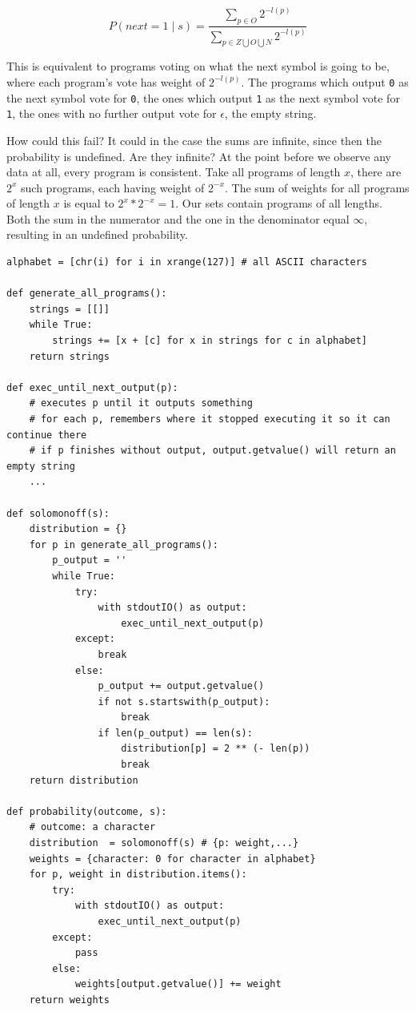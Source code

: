 $$\displaystyle P(next=1 \mid s) = \frac{\sum\limits_{p \in O} 2^{-l(p)}}{\sum\limits_{p \in Z \bigcup O \bigcup N} 2^{-l(p)}}$$

This is equivalent to programs voting on what the next symbol is going to be, where each program's vote has weight of $2^{-l(p)}$.
The programs which output \texttt{0} as the next symbol vote for \texttt{0}, the ones which output \texttt{1} as the next symbol vote for \texttt{1}, the ones with no further output vote for $\epsilon$, the empty string.

How could this fail?
It could in the case the sums are infinite, since then the probability is undefined.
Are they infinite?
At the point before we observe any data at all, every program is consistent.
Take all programs of length $x$, there are $2^x$ such programs, each having weight of $2^{-x}$.
The sum of weights for all programs of length $x$ is equal to $2^x * 2^{-x} = 1$.
Our sets contain programs of all lengths.
Both the sum in the numerator and the one in the denominator equal $\infty$, resulting in an undefined probability.

\newpage

\begin{lstlisting}[caption={A naive algorithmic induction implementation, which runs into a problem with infinite sums.}]
alphabet = [chr(i) for i in xrange(127)] # all ASCII characters

def generate_all_programs():
	strings = [[]]
	while True:
		strings += [x + [c] for x in strings for c in alphabet]
	return strings

def exec_until_next_output(p):
	# executes p until it outputs something
	# for each p, remembers where it stopped executing it so it can continue there
	# if p finishes without output, output.getvalue() will return an empty string
	...

def solomonoff(s):
	distribution = {}
	for p in generate_all_programs():
		p_output = ''
		while True:
			try:
				with stdoutIO() as output:
					exec_until_next_output(p)
			except:
				break
			else:
				p_output += output.getvalue()
				if not s.startswith(p_output):
					break
				if len(p_output) == len(s):
					distribution[p] = 2 ** (- len(p))
					break
	return distribution

def probability(outcome, s):
	# outcome: a character
	distribution  = solomonoff(s) # {p: weight,...}
	weights = {character: 0 for character in alphabet}
	for p, weight in distribution.items():
		try:
			with stdoutIO() as output:
				exec_until_next_output(p)
		except:
			pass
		else:
			weights[output.getvalue()] += weight
	return weights
\end{lstlisting}

